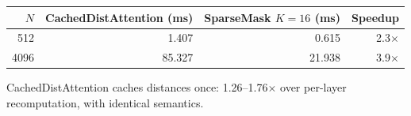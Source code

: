 \begin{frame}
  \centering
  \small
  \renewcommand{\arraystretch}{1.35}
  \begin{tabular}{@{}rrrr@{}}
    \toprule
    $N$ & CachedDistAttention (ms) & SparseMask $K{=}16$ (ms) & Speedup\\
    \midrule
    512 & 1.407 & 0.615 & 2.3$\times$\\
    4096 & 85.327 & 21.938 & 3.9$\times$\\
    \bottomrule
  \end{tabular}
  \vspace{5mm}

  {\footnotesize CachedDistAttention caches distances once: 1.26--1.76$\times$ over per-layer recomputation, with identical semantics.\par}
\end{frame}

